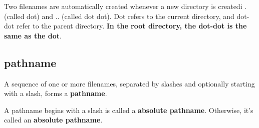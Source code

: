 \documentclass[a4paper,11pt]{book}
\begin{document}
Two filenames are automatically created whenever a new directory is createdi .
(called dot) and .. (called dot dot). Dot refers to the current directory, and
dot-dot refer to the parent directory. \textbf{In the root directory, the
dot-dot is the same as the dot}. 

\subsection{pathname}
A sequence of one or more filenames, separated by slashes and optionally
starting with a slash, forms a \textbf{pathname}.

A pathname begins with a slash is called a \textbf{absolute pathname}.
Otherwise, it's called an \textbf{absolute pathname}.
\end{document}
